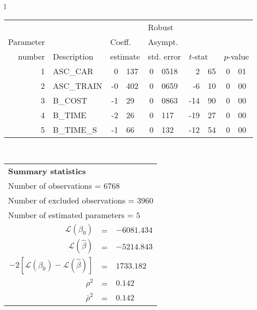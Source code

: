   \begin{tabular}{l}
\begin{tabular}{rlr@{.}lr@{.}lr@{.}lr@{.}l}
         &                       &   \multicolumn{2}{l}{}    & \multicolumn{2}{l}{Robust}  &     \multicolumn{4}{l}{}   \\
Parameter &                       &   \multicolumn{2}{l}{Coeff.}      & \multicolumn{2}{l}{Asympt.}  &     \multicolumn{4}{l}{}   \\
number &  Description                     &   \multicolumn{2}{l}{estimate}      & \multicolumn{2}{l}{std. error}  &   \multicolumn{2}{l}{$t$-stat}  &   \multicolumn{2}{l}{$p$-value}   \\

\hline

1 & ASC_CAR & 0&137 & 0&0518 & 2&65 & 0&01\\
2 & ASC_TRAIN & -0&402 & 0&0659 & -6&10 & 0&00\\
3 & B_COST & -1&29 & 0&0863 & -14&90 & 0&00\\
4 & B_TIME & -2&26 & 0&117 & -19&27 & 0&00\\
5 & B_TIME_S & -1&66 & 0&132 & -12&54 & 0&00\\
\hline
\end{tabular}
\\
\begin{tabular}{rcl}
\multicolumn{3}{l}{\bf Summary statistics}\\
\multicolumn{3}{l}{ Number of observations = $6768$} \\
\multicolumn{3}{l}{ Number of excluded observations = $3960$} \\
\multicolumn{3}{l}{ Number of estimated  parameters = $5$} \\
 $\mathcal{L}(\beta_0)$ &=&  $-6081.434$ \\
 $\mathcal{L}(\hat{\beta})$ &=& $-5214.843 $  \\
 $-2[\mathcal{L}(\beta_0) -\mathcal{L}(\hat{\beta})]$ &=& $1733.182$ \\
    $\rho^2$ &=&   $0.142$ \\
    $\bar{\rho}^2$ &=&    $0.142$ \\
\end{tabular}
  \end{tabular}
